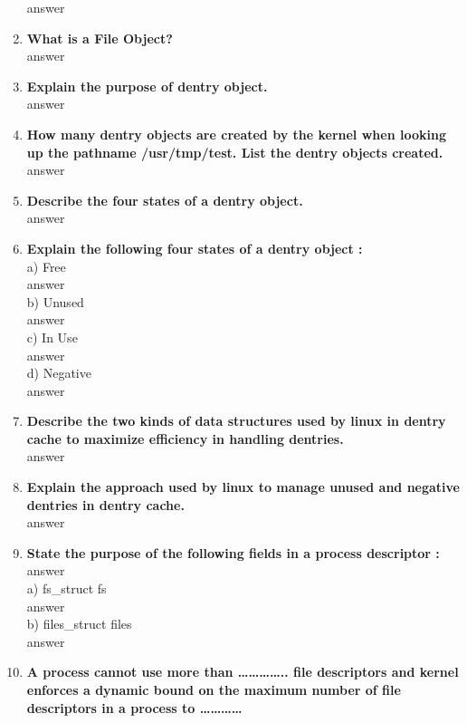 \documentclass[a4paper,12pt]{article}
\begin{document}
\begin{flushleft}
\begin{enumerate}
{\color{red}answer}\\
\item \textbf{  What is a File Object?}\\
{\color{red}answer}\\
\item \textbf{  Explain the purpose of dentry object.}\\
{\color{red}answer}\\
\item \textbf{  How many dentry objects are created by the kernel when looking up the pathname /usr/tmp/test. List the dentry objects created.}\\
{\color{red}answer}\\
\item \textbf{  Describe the four states of a dentry object.}\\
{\color{red}answer}\\
\item \textbf{  Explain the following four states of a dentry object :}\\
a) Free\\{\color{red}answer}\\
 b) Unused\\{\color{red}answer}\\
  c) In Use\\{\color{red}answer}\\
 d) Negative\\{\color{red}answer}\\
\item \textbf{  Describe the two kinds of data structures used by linux in dentry cache to maximize efficiency in handling dentries.}\\
{\color{red}answer}\\
\item \textbf{  Explain the approach used by linux to manage unused and negative dentries in dentry cache.}\\
{\color{red}answer}\\
\item \textbf{  State the purpose of the following fields in a process descriptor :}\\
{\color{red}answer}\\
a) fs\_struct fs \\{\color{red}answer}\\
b) files\_struct files \\{\color{red}answer}\\
\item \textbf{  A process cannot use more than ………….. file descriptors and kernel enforces a dynamic bound on the maximum number of file descriptors in a process to …………}\\

\end{enumerate}
\end{flushleft}
\end{document}
